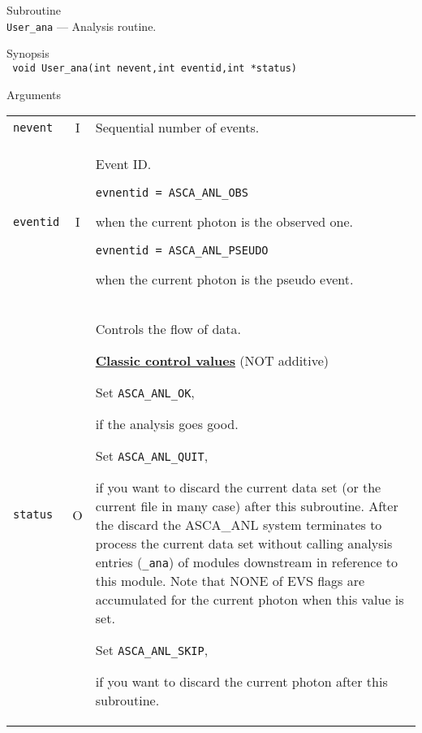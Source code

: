 \newpage
\begin{description}
\item{Subroutine}\\
   {\tt User\_ana} --- Analysis routine.
\item{Synopsis}\\
   {\tt
      void User\_ana(int nevent,int eventid,int *status) \\
   }
\item{Arguments} \\

 \begin{tabular}{l@{\ (}c@{)\ }p{}}
   {\tt nevent} & I & Sequential number of events.\\
   {\tt eventid} & I & Event ID.\par
        {\tt evnentid = ASCA\_ANL\_OBS}\par
        \hfill\parbox{0.65\textwidth}{
             when the current photon is the observed one.
        }\par
        {\tt evnentid = ASCA\_ANL\_PSEUDO}\par
        \hfill\parbox{0.65\textwidth}{
             when the current photon is the pseudo event.
        }\par\\
   {\tt status} & O & Controls the flow of data.\par
        \medskip
        \underline{\bf Classic control values} (NOT additive) \par
        Set {\tt ASCA\_ANL\_OK},\par
        \hfill\parbox{0.65\textwidth}{
            if the analysis goes good.
        }\par
        Set {\tt ASCA\_ANL\_QUIT},\par
        \hfill\parbox{0.65\textwidth}{
            if you want to discard the current data set (or the current file
            in many case) after this subroutine.
            After the discard
            the ASCA\_ANL system terminates to process the current data set
            without calling analysis entries ({\tt *\_ana}) of modules 
            downstream in reference to this module.
            Note that NONE of EVS flags are accumulated for the current photon
            when this value is set.
        }\par
        Set {\tt ASCA\_ANL\_SKIP},\par
        \hfill\parbox{0.65\textwidth}{
            if you want to discard the current photon after this subroutine.
}
\end{tabular}
\end{description}
